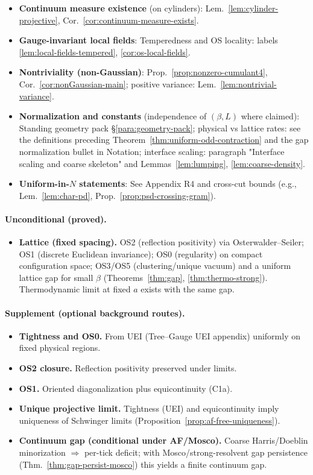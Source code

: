 \documentclass[11pt]{amsart}
\theoremstyle{plain}
\theoremstyle{definition}
\theoremstyle{remark}
\begin{document}
\begin{itemize}
  \item \textbf{Continuum measure existence} (on cylinders): Lem.~\ref{lem:cylinder-projective}, Cor.~\ref{cor:continuum-measure-exists}.
  \item \textbf{Gauge-invariant local fields}: Temperedness and OS locality: labels \ref{lem:local-fields-tempered}, \ref{cor:os-local-fields}.
  \item \textbf{Nontriviality (non-Gaussian)}: Prop.~\ref{prop:nonzero-cumulant4}, Cor.~\ref{cor:nonGaussian-main}; positive variance: Lem.~\ref{lem:nontrivial-variance}.
  \item \textbf{Normalization and constants} (independence of $(\beta,L)$ where claimed): Standing geometry pack \S\ref{para:geometry-pack}; physical vs lattice rates: see the definitions preceding Theorem~\ref{thm:uniform-odd-contraction} and the gap normalization bullet in Notation; interface scaling: paragraph "Interface scaling and coarse skeleton" and Lemmas~\ref{lem:lumping}, \ref{lem:coarse-density}.
  \item \textbf{Uniform-in-$N$ statements}: See Appendix R4 and cross-cut bounds (e.g., Lem.~\ref{lem:char-pd}, Prop.~\ref{prop:psd-crossing-gram}).
\end{itemize}

\paragraph{Unconditional (proved).}
\begin{itemize}
  \item \textbf{Lattice (fixed spacing).} OS2 (reflection positivity) via Osterwalder--Seiler; OS1 (discrete Euclidean invariance); OS0 (regularity) on compact configuration space; OS3/OS5 (clustering/unique vacuum) and a uniform lattice gap for small $\beta$ (Theorems~\ref{thm:gap}, \ref{thm:thermo-strong}). Thermodynamic limit at fixed $a$ exists with the same gap.
\end{itemize}

\paragraph{Supplement (optional background routes).}
\begin{itemize}
  \item \textbf{Tightness and OS0.} From UEI (Tree--Gauge UEI appendix) uniformly on fixed physical regions.
  \item \textbf{OS2 closure.} Reflection positivity preserved under limits.
  \item \textbf{OS1.} Oriented diagonalization plus equicontinuity (C1a).
  \item \textbf{Unique projective limit.} Tightness (UEI) and equicontinuity imply uniqueness of Schwinger limits (Proposition~\ref{prop:af-free-uniqueness}).
  \item \textbf{Continuum gap (conditional under AF/Mosco).} Coarse Harris/Doeblin minorization $\Rightarrow$ per-tick deficit; with Mosco/strong-resolvent gap persistence (Thm.~\ref{thm:gap-persist-mosco}) this yields a finite continuum gap.
\end{itemize}
\end{document}
